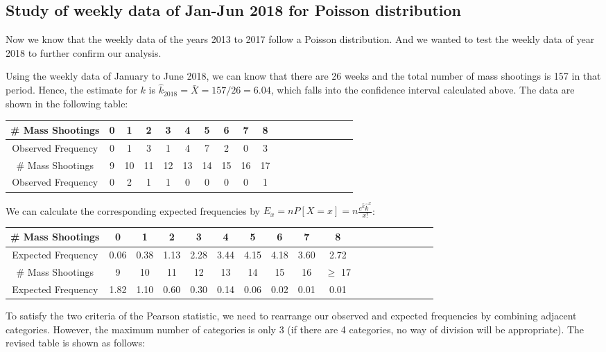 \documentclass[12pt]{article}
\begin{document}
\subsection{Study of weekly data of Jan-Jun 2018 for Poisson distribution}
Now we know that the weekly data of the years 2013 to 2017 follow a Poisson distribution. And we wanted to test the weekly data of year 2018 to further confirm our analysis.
\par Using the weekly data of January to June 2018, we can know that there are 26 weeks and the total number of mass shootings is 157 in that period. Hence, the estimate for $k$ is $\hat{k}_{2018}=\bar X=157/26=6.04$, which falls into the confidence interval calculated above. The data are shown in the following table:
\begin{center}
\begin{tabular}{|c|c|c|c|c|c|c|c|c|c|c|c|c|c|c|c|c|c|}
\hline
\# Mass Shootings & 0 & 1 & 2 & 3 & 4 & 5 & 6 & 7 & 8 \\ \hline
Observed Frequency & 0 & 1 & 3 & 1 & 4 & 7 & 2 & 0 & 3 \\ \hline
\# Mass Shootings & 9 & 10 & 11 & 12 & 13 & 14 & 15 & 16 & 17 \\ \hline
Observed Frequency & 0 & 2  & 1  & 1  & 0  & 0  & 0  & 0  & 1 \\ \hline
\end{tabular}
\end{center}
\par We can calculate the corresponding expected frequencies by $E_{x}=nP[X=x]=n\frac{e^{\hat k}\hat k^x}{x!}$:
\begin{center}
\begin{tabular}{|c|c|c|c|c|c|c|c|c|c|c|c|c|c|c|c|c|c|}
\hline
\# Mass Shootings &0 & 1 & 2 & 3 & 4 & 5 & 6 & 7 & 8 \\ \hline
Expected Frequency & 0.06 & 0.38 & 1.13 & 2.28 & 3.44 & 4.15 & 4.18 & 3.60 & 2.72\\ \hline
\# Mass Shootings & 9 & 10 & 11 & 12 & 13 & 14 & 15 & 16 & $\geq$ 17 \\ \hline
Expected Frequency  & 1.82 & 1.10  & 0.60  & 0.30  & 0.14  & 0.06  & 0.02  & 0.01  & 0.01\\ \hline
\end{tabular}
\end{center}
\par To satisfy the two criteria of the Pearson statistic, we need to rearrange our observed and expected frequencies by combining adjacent categories. However, the maximum number of categories is only 3 (if there are 4 categories, no way of division will be appropriate). The revised table is shown as follows:
\end{document}
